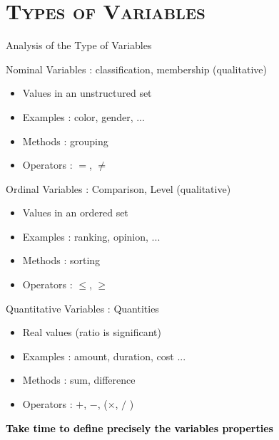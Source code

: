 \documentclass[xcolor=x11names,compress,8pt,
handout
]{beamer}
\def\leq{\leqslant}
\def\geq{\geqslant}
\renewcommand{\(}{\begin{columns}}
\renewcommand{\)}{\end{columns}}
\newcommand{\<}[1]{\begin{column}{#1}}
\renewcommand{\>}{\end{column}}
\begin{document}
\section[{\scshape Types}]{{\scshape Types of Variables} }
\begin{frame}{Analysis of  the Type of  Variables}

\begin{alertblock}{Nominal Variables : classification, membership (qualitative)}
\begin{itemize}
\item Values in an unstructured set
\item Examples : color, gender, ...
\item Methods : grouping 
\item Operators : $=$, $\neq$
\end{itemize}
\end{alertblock}
\pause
\begin{alertblock}{Ordinal Variables : Comparison, Level (qualitative)}
\begin{itemize}
\item Values in an ordered set
\item Examples : ranking, opinion, ...
\item Methods :  sorting 
\item Operators : $\leq$, $\geq$
\end{itemize}
\end{alertblock}
\pause
\begin{alertblock}{Quantitative Variables : Quantities}
\begin{itemize}
\item Real values (ratio is significant)
\item Examples : amount, duration, cost ...
\item Methods :  sum, difference 
\item Operators : $+$, $-$, ($\times$, $/$ )
\end{itemize}
\end{alertblock}
\vfill

\centerline{\colorbox{yellow!85}{\textcolor{black}{\textbf{\large Take time to define precisely the variables properties}}}}
\end{frame}
\end{document}
